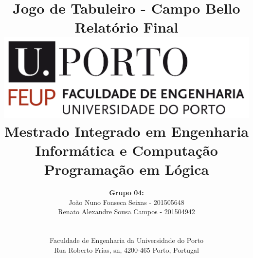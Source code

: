 \documentclass[a4paper]{article}
\begin{document}
\setlength{\textwidth}{16cm}
\setlength{\textheight}{22cm}

\title{\Huge\textbf{Jogo de Tabuleiro - Campo Bello}\linebreak\linebreak\linebreak
\Large\textbf{Relatório Final}\linebreak\linebreak
\linebreak\linebreak
\includegraphics[scale=0.1]{feup-logo.png}\linebreak\linebreak
\linebreak\linebreak
\Large{Mestrado Integrado em Engenharia Informática e Computação} \linebreak\linebreak
\Large{Programação em Lógica}\linebreak
}

\author{\textbf{Grupo 04:}\\ João Nuno Fonseca Seixas - 201505648 \\ Renato Alexandre Sousa Campos - 201504942 \\\linebreak\linebreak \\
 \\ Faculdade de Engenharia da Universidade do Porto \\ Rua Roberto Frias, s\/n, 4200-465 Porto, Portugal \linebreak\linebreak\linebreak
\linebreak\linebreak\vspace{1cm}}
\maketitle
\thispagestyle{empty}
\end{document}
